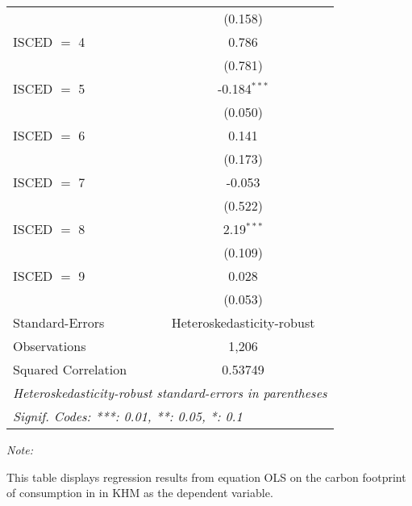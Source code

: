 \begin{table}[htbp!]
\begin{adjustbox}{width = 1\textwidth, max height = 0.95\textheight, center}
\begin{threeparttable}[b]
\begin{tabular}{lc}
                                & (0.158)\\   
            ISCED $=$ 4         & 0.786\\   
                                & (0.781)\\   
            ISCED $=$ 5         & -0.184$^{***}$\\   
                                & (0.050)\\   
            ISCED $=$ 6         & 0.141\\   
                                & (0.173)\\   
            ISCED $=$ 7         & -0.053\\   
                                & (0.522)\\   
            ISCED $=$ 8         & 2.19$^{***}$\\   
                                & (0.109)\\   
            ISCED $=$ 9         & 0.028\\   
                                & (0.053)\\   
            \midrule 
            Standard-Errors     & Heteroskedasticity-robust \\   
            Observations        & 1,206\\  
            Squared Correlation & 0.53749\\  
            \midrule \midrule
            \multicolumn{2}{l}{\emph{Heteroskedasticity-robust standard-errors in parentheses}}\\
            \multicolumn{2}{l}{\emph{Signif. Codes: ***: 0.01, **: 0.05, *: 0.1}}\\
         \end{tabular}
         
         \begin{tablenotes}\item \medskip \textit{Note:}
            \item This table displays regression results from equation OLS on the carbon footprint of consumption in  in KHM as the dependent variable.  
         \end{tablenotes}
      \end{threeparttable}
   \end{adjustbox}
\end{table}


